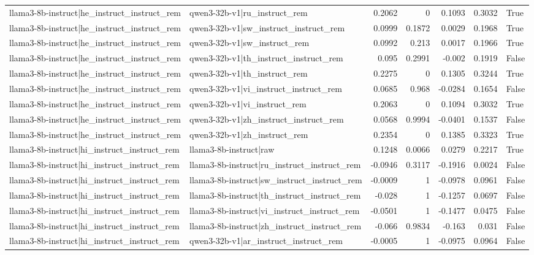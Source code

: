\begin{table}
\begin{tabular}{l l r r r r l}
llama3-8b-instruct|he_instruct_instruct_rem & qwen3-32b-v1|ru_instruct_rem & 0.2062 & 0 & 0.1093 & 0.3032 & True \\
llama3-8b-instruct|he_instruct_instruct_rem & qwen3-32b-v1|sw_instruct_instruct_rem & 0.0999 & 0.1872 & 0.0029 & 0.1968 & True \\
llama3-8b-instruct|he_instruct_instruct_rem & qwen3-32b-v1|sw_instruct_rem & 0.0992 & 0.213 & 0.0017 & 0.1966 & True \\
llama3-8b-instruct|he_instruct_instruct_rem & qwen3-32b-v1|th_instruct_instruct_rem & 0.095 & 0.2991 & -0.002 & 0.1919 & False \\
llama3-8b-instruct|he_instruct_instruct_rem & qwen3-32b-v1|th_instruct_rem & 0.2275 & 0 & 0.1305 & 0.3244 & True \\
llama3-8b-instruct|he_instruct_instruct_rem & qwen3-32b-v1|vi_instruct_instruct_rem & 0.0685 & 0.968 & -0.0284 & 0.1654 & False \\
llama3-8b-instruct|he_instruct_instruct_rem & qwen3-32b-v1|vi_instruct_rem & 0.2063 & 0 & 0.1094 & 0.3032 & True \\
llama3-8b-instruct|he_instruct_instruct_rem & qwen3-32b-v1|zh_instruct_instruct_rem & 0.0568 & 0.9994 & -0.0401 & 0.1537 & False \\
llama3-8b-instruct|he_instruct_instruct_rem & qwen3-32b-v1|zh_instruct_rem & 0.2354 & 0 & 0.1385 & 0.3323 & True \\
llama3-8b-instruct|hi_instruct_instruct_rem & llama3-8b-instruct|raw & 0.1248 & 0.0066 & 0.0279 & 0.2217 & True \\
llama3-8b-instruct|hi_instruct_instruct_rem & llama3-8b-instruct|ru_instruct_instruct_rem & -0.0946 & 0.3117 & -0.1916 & 0.0024 & False \\
llama3-8b-instruct|hi_instruct_instruct_rem & llama3-8b-instruct|sw_instruct_instruct_rem & -0.0009 & 1 & -0.0978 & 0.0961 & False \\
llama3-8b-instruct|hi_instruct_instruct_rem & llama3-8b-instruct|th_instruct_instruct_rem & -0.028 & 1 & -0.1257 & 0.0697 & False \\
llama3-8b-instruct|hi_instruct_instruct_rem & llama3-8b-instruct|vi_instruct_instruct_rem & -0.0501 & 1 & -0.1477 & 0.0475 & False \\
llama3-8b-instruct|hi_instruct_instruct_rem & llama3-8b-instruct|zh_instruct_instruct_rem & -0.066 & 0.9834 & -0.163 & 0.031 & False \\
llama3-8b-instruct|hi_instruct_instruct_rem & qwen3-32b-v1|ar_instruct_instruct_rem & -0.0005 & 1 & -0.0975 & 0.0964 & False \\

\end{tabular}
\end{table}
